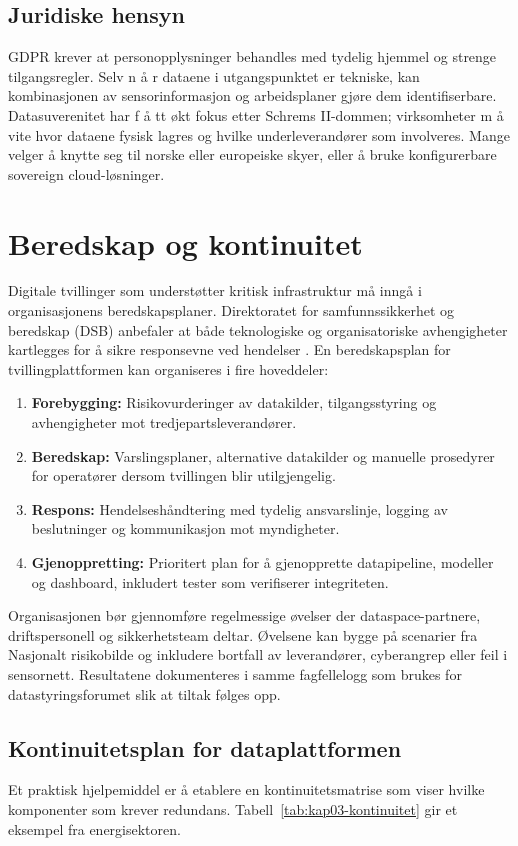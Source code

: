 \subsection{Juridiske hensyn}
GDPR krever at personopplysninger behandles med tydelig hjemmel og strenge tilgangsregler. Selv n å r dataene i utgangspunktet er tekniske, kan kombinasjonen av sensorinformasjon og arbeidsplaner gjøre dem identifiserbare. Datasuverenitet har f å tt økt fokus etter Schrems II-dommen; virksomheter m å vite hvor dataene fysisk lagres og hvilke underleverandører som involveres. Mange velger  å knytte seg til norske eller europeiske skyer, eller  å bruke konfigurerbare sovereign cloud-løsninger.

\section{Beredskap og kontinuitet}
Digitale tvillinger som understøtter kritisk infrastruktur må inngå i organisasjonens beredskapsplaner. Direktoratet for
samfunnssikkerhet og beredskap (DSB) anbefaler at både teknologiske og organisatoriske avhengigheter kartlegges for å sikre
responsevne ved hendelser \citep{dsb2023nrb}. En beredskapsplan for tvillingplattformen kan organiseres i fire hoveddeler:
\begin{enumerate}
    \item \textbf{Forebygging:} Risikovurderinger av datakilder, tilgangsstyring og avhengigheter mot tredjepartsleverandører.
    \item \textbf{Beredskap:} Varslingsplaner, alternative datakilder og manuelle prosedyrer for operatører dersom tvillingen blir utilgjengelig.
    \item \textbf{Respons:} Hendelseshåndtering med tydelig ansvarslinje, logging av beslutninger og kommunikasjon mot myndigheter.
    \item \textbf{Gjenoppretting:} Prioritert plan for å gjenopprette datapipeline, modeller og dashboard, inkludert tester som verifiserer integriteten.
\end{enumerate}

Organisasjonen bør gjennomføre regelmessige øvelser der dataspace-partnere, driftspersonell og sikkerhetsteam deltar. Øvelsene
kan bygge på scenarier fra Nasjonalt risikobilde og inkludere bortfall av leverandører, cyberangrep eller feil i sensornett.
Resultatene dokumenteres i samme fagfellelogg som brukes for datastyringsforumet slik at tiltak følges opp.

\subsection{Kontinuitetsplan for dataplattformen}
Et praktisk hjelpemiddel er å etablere en kontinuitetsmatrise som viser hvilke komponenter som krever redundans. Tabell~\ref{tab:kap03-kontinuitet}
gir et eksempel fra energisektoren.

